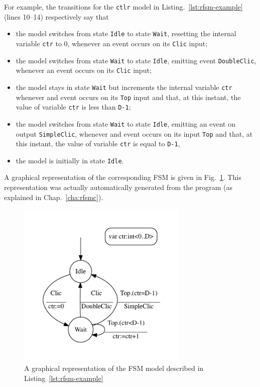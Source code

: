\medskip
For example, the transitions for the \verb|ctlr| model in Listing.~\ref{lst:rfsm-example}
(lines 10--14) respectively say that
\begin{itemize}
\item the model switches from state \verb|Idle| to state \verb|Wait|, resetting the internal variable
  \verb|ctr| to 0, whenever an event occurs on its \verb|Clic| input;
\item the model switches from state \verb|Wait| to state \verb|Idle|, emitting event
  \verb|DoubleClic|, whenever an event occurs on its \verb|Clic| input;
\item the model stays in state \verb|Wait| but increments the internal variable \verb|ctr| whenever and event occurs
on its \verb|Top| input and that, at this instant, the value of variable \verb|ctr| is less than
\verb|D-1|;
\item the model switches from state \verb|Wait| to state \verb|Idle|, emitting an event on output
\verb|SimpleClic|, whenever and event occurs on its input \verb|Top| and that, at this instant, the
value of variable \verb|ctr| is equal to \verb|D-1|,
\item the model is initially in state \verb|Idle|.
\end{itemize}

A graphical representation of the corresponding FSM is given in
Fig.~\ref{fig:rfsm-example-dot}.  This representation was actually automatically generated from the
program (as explained in Chap.~\ref{cha:rfsmc}). 

\begin{figure}[h]
   \includegraphics[height=8cm]{figs/ctlsouris-model}
   \centering
  \caption{A graphical representation of the FSM model described in Listing~\ref{lst:rfsm-example}}
  \label{fig:rfsm-example-dot}
\end{figure}

